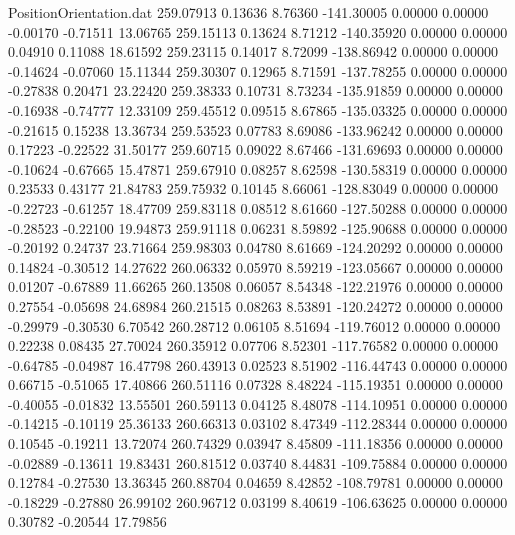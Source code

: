 \begin{filecontents}{PositionOrientation.dat}
 259.07913    0.13636    8.76360  -141.30005    0.00000    0.00000   -0.00170   -0.71511   13.06765
 259.15113    0.13624    8.71212  -140.35920    0.00000    0.00000    0.04910    0.11088   18.61592
 259.23115    0.14017    8.72099  -138.86942    0.00000    0.00000   -0.14624   -0.07060   15.11344
 259.30307    0.12965    8.71591  -137.78255    0.00000    0.00000   -0.27838    0.20471   23.22420
 259.38333    0.10731    8.73234  -135.91859    0.00000    0.00000   -0.16938   -0.74777   12.33109
 259.45512    0.09515    8.67865  -135.03325    0.00000    0.00000   -0.21615    0.15238   13.36734
 259.53523    0.07783    8.69086  -133.96242    0.00000    0.00000    0.17223   -0.22522   31.50177
 259.60715    0.09022    8.67466  -131.69693    0.00000    0.00000   -0.10624   -0.67665   15.47871
 259.67910    0.08257    8.62598  -130.58319    0.00000    0.00000    0.23533    0.43177   21.84783
 259.75932    0.10145    8.66061  -128.83049    0.00000    0.00000   -0.22723   -0.61257   18.47709
 259.83118    0.08512    8.61660  -127.50288    0.00000    0.00000   -0.28523   -0.22100   19.94873
 259.91118    0.06231    8.59892  -125.90688    0.00000    0.00000   -0.20192    0.24737   23.71664
 259.98303    0.04780    8.61669  -124.20292    0.00000    0.00000    0.14824   -0.30512   14.27622
 260.06332    0.05970    8.59219  -123.05667    0.00000    0.00000    0.01207   -0.67889   11.66265
 260.13508    0.06057    8.54348  -122.21976    0.00000    0.00000    0.27554   -0.05698   24.68984
 260.21515    0.08263    8.53891  -120.24272    0.00000    0.00000   -0.29979   -0.30530    6.70542
 260.28712    0.06105    8.51694  -119.76012    0.00000    0.00000    0.22238    0.08435   27.70024
 260.35912    0.07706    8.52301  -117.76582    0.00000    0.00000   -0.64785   -0.04987   16.47798
 260.43913    0.02523    8.51902  -116.44743    0.00000    0.00000    0.66715   -0.51065   17.40866
 260.51116    0.07328    8.48224  -115.19351    0.00000    0.00000   -0.40055   -0.01832   13.55501
 260.59113    0.04125    8.48078  -114.10951    0.00000    0.00000   -0.14215   -0.10119   25.36133
 260.66313    0.03102    8.47349  -112.28344    0.00000    0.00000    0.10545   -0.19211   13.72074
 260.74329    0.03947    8.45809  -111.18356    0.00000    0.00000   -0.02889   -0.13611   19.83431
 260.81512    0.03740    8.44831  -109.75884    0.00000    0.00000    0.12784   -0.27530   13.36345
 260.88704    0.04659    8.42852  -108.79781    0.00000    0.00000   -0.18229   -0.27880   26.99102
 260.96712    0.03199    8.40619  -106.63625    0.00000    0.00000    0.30782   -0.20544   17.79856

\end{filecontents}
